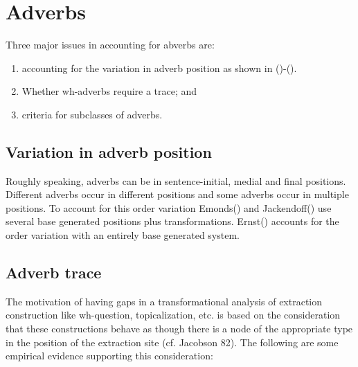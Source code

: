 \section{Adverbs}

Three major issues in accounting for abverbs are:
\begin{enumerate}
\item accounting for the variation in adverb position as shown in
()-(). 


\item Whether wh-adverbs require a trace; and
\item criteria for subclasses of adverbs.
\end{enumerate}

\subsection{Variation in adverb position}
 Roughly speaking, adverbs can be in sentence-initial, medial and
final positions.  Different adverbs occur in different positions and
some adverbs occur in multiple positions.  To account for this order
variation Emonds() and
Jackendoff() use several base generated
positions plus transformations.  Ernst() accounts for
the order variation with an entirely base generated system.  


\subsection{Adverb trace}
The motivation of having gaps in a transformational analysis of
extraction construction like wh-question, topicalization, etc. is
based on the consideration that these constructions behave
as though there is a node of the appropriate type in the position of
the extraction site (cf. Jacobson 82). The following are some
empirical evidence supporting this consideration:

